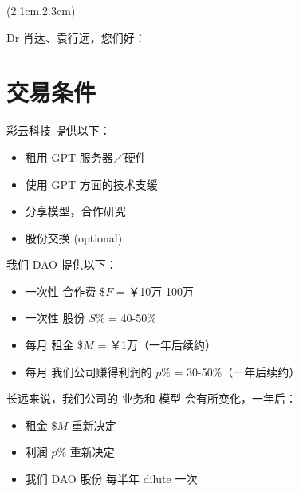 \begin{preview}

\cc{
\title{\vspace{-1.5cm} \bfseries\color{blue}{\LARGE 彩云科技 \& 渡过雪原 商业建议书}}
}{
\title{\vspace{-1.5cm} \bfseries\color{blue}{\LARGE Colorful Cloud business proposal}}
}

\date{\vspace{-2cm}} %

\maketitle

\setcounter{section}{-1}

\begin{textblock*}{5cm}(2.1cm,2.3cm) %
{}
\end{textblock*}

\begin{minipage}{\textwidth}
\setlength{\parskip}{0.4\baselineskip}

Dr 肖达、袁行远，您们好：

\section{交易条件}

彩云科技 提供以下：
\begin{itemize}
	\item 租用 GPT 服务器／硬件
	\item 使用 GPT 方面的技术支缓
	\item 分享模型，合作研究
	\item 股份交换 (optional)
\end{itemize}

我们 DAO 提供以下：
\begin{itemize}
	\item 一次性 合作费 \$$F$ = ￥10万-100万
	\item 一次性 股份 $S$\% = 40-50\%
	\item 每月 租金 \$$M$ = ￥1万（一年后续约）
	\item 每月 我们公司赚得利润的 $p$\% = 30-50\%（一年后续约）
\end{itemize}

长远来说，我们公司的 业务和 模型 会有所变化，一年后：
\begin{itemize}
	\item 租金 \$$M$ 重新决定
	\item 利润 $p$\% 重新决定
	\item 我们 DAO 股份 每半年 dilute 一次
\end{itemize}

\end{minipage}
\end{preview}

